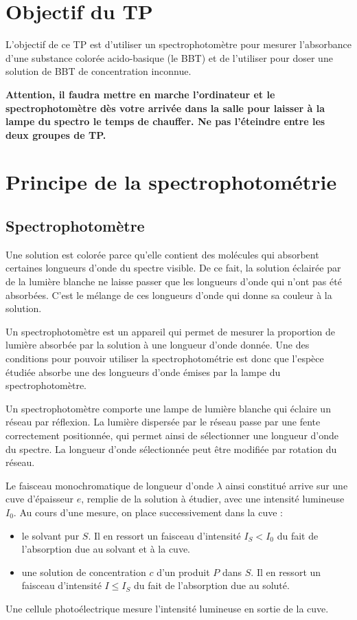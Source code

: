 \documentclass{tp}
\begin{document}


\section{Objectif du TP}
L'objectif de ce TP est d'utiliser un spectrophotomètre pour mesurer l'absorbance d'une substance colorée acido-basique (le BBT) et de l'utiliser pour doser une solution de BBT de concentration inconnue.

\textbf{Attention, il faudra mettre en marche l'ordinateur et le spectrophotomètre dès votre arrivée dans la salle pour laisser à la lampe du spectro le temps de chauffer. Ne pas l'éteindre entre les deux groupes de TP.
}  

\section{Principe de la spectrophotométrie}%
\label{sec:principe_de_la_spectrophotometrie}
\subsection{Spectrophotomètre}%
\label{sub:spectrophotometre}

Une solution est colorée parce qu'elle contient des molécules qui absorbent certaines longueurs d'onde du spectre visible. De ce fait, la solution éclairée par de la lumière blanche ne laisse passer que les longueurs d'onde qui n'ont pas été absorbées. C'est le mélange de ces longueurs d'onde qui donne sa couleur à la solution.

Un spectrophotomètre est un appareil qui permet de mesurer la proportion de lumière absorbée par la solution à une longueur d'onde donnée. Une des conditions pour pouvoir utiliser la spectrophotométrie est donc que l'espèce étudiée absorbe une des longueurs d'onde émises par la lampe du spectrophotomètre.

Un spectrophotomètre comporte une lampe de lumière blanche qui éclaire un réseau par réflexion. La lumière dispersée par le réseau passe par une fente correctement positionnée, qui permet ainsi de sélectionner une longueur d'onde du spectre. La longueur d'onde sélectionnée peut être modifiée par rotation du réseau.

Le faisceau monochromatique de longueur d'onde $\lambda$ ainsi constitué arrive sur une cuve d'épaisseur $e$, remplie de la solution à étudier, avec une intensité lumineuse $I_0$. Au cours d'une mesure, on place successivement dans la cuve :
\begin{itemize}
  \item le solvant pur $S$. Il en ressort un faisceau d'intensité $I_{S}<I_0$ du fait de l'absorption due au solvant et à la cuve.
  \item une solution de concentration $c$ d'un produit $P$ dans $S$. Il en ressort un faisceau d'intensité $I \leq I_S$ du fait de l'absorption due au soluté.
\end{itemize}
Une cellule photoélectrique mesure l'intensité lumineuse en sortie de la cuve.
\end{document}
